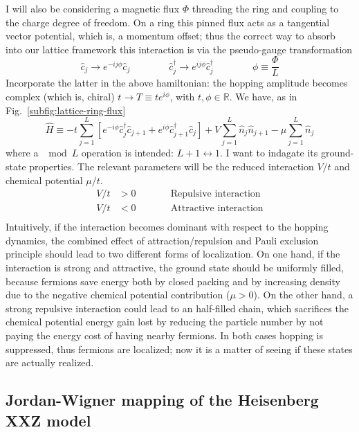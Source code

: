 I will also be considering a magnetic flux $\Phi$ threading the ring and coupling to the charge degree of freedom. On a ring this pinned flux acts as a tangential vector potential, which is, a momentum offset; thus the correct way to absorb into our lattice framework this interaction is via the pseudo-gauge transformation
\begin{equation}\label{eq:pseudo-gauge-transformation}
	\hat c_j \to e^{-ij \phi} \hat c_j
	\qquad\qquad
	\hat c_j^\dagger \to e^{ij \phi} \hat c_j^\dagger
	\qquad\qquad
	\phi \equiv \frac{\Phi}{L}
\end{equation}
Incorporate the latter in the above hamiltonian: the hopping amplitude becomes complex (which is, chiral) $t \to T \equiv t e^{i\phi}$, with $t, \phi \in \mathbb{R}$. We have, as in Fig.~\ref{subfig:lattice-ring-flux}
\begin{equation}\label{eq:spinless-hamiltonian-tbc}
	\hat H \equiv -t \sum_{j=1}^L \left[ 
		e^{-i\phi} \hat c_j^\dagger \hat c_{j+1} + e^{i\phi} \hat c_{j+1}^\dagger \hat c_j 
	\right] + V \sum_{j=1}^L \hat n_j \hat n_{j+1} - \mu \sum_{j=1}^L \hat n_j
\end{equation}
where a $\mod L$ operation is intended: $L+1 \leftrightarrow 1$. I want to indagate its ground-state properties. The relevant parameters will be the reduced interaction $V/t$ and chemical potential $\mu/t$.
\[
	\begin{aligned}
		V/t &> 0 \qquad
		&&\text{Repulsive interaction} \\
		V/t &< 0 \qquad
		&&\text{Attractive interaction} \\
	\end{aligned}
\]
Intuitively, if the interaction becomes dominant with respect to the hopping dynamics, the combined effect of attraction/repulsion and Pauli exclusion principle should lead to two different forms of localization. On one hand, if the interaction is strong and attractive, the ground state should be uniformly filled, because fermions save energy both by closed packing and by increasing density due to the negative chemical potential contribution ($\mu > 0$). On the other hand, a strong repulsive interaction could lead to an half-filled chain, which sacrifices the chemical potential energy gain lost by reducing the particle number by not paying the energy cost of having nearby fermions. In both cases hopping is suppressed, thus fermions are localized; now it is a matter of seeing if these states are actually realized.

\subsection{Jordan-Wigner mapping of the Heisenberg XXZ model}

